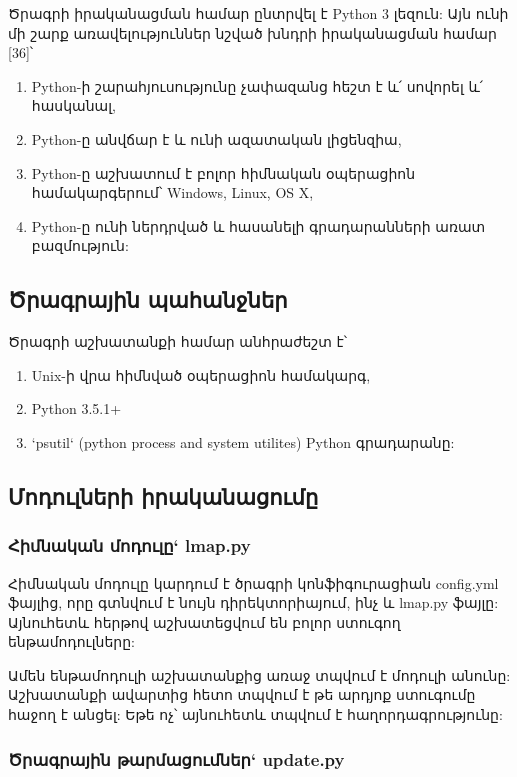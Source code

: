 \documentclass[a4paper,12pt]{article}
\begin{document}
\begin{sloppypar}
Ծրագրի իրականացման համար ընտրվել է Python 3 լեզուն:
Այն ունի մի շարք առավելություններ նշված խնդրի իրականացման համար [36]՝

\begin{enumerate}
\item Python-ի շարահյուսությունը չափազանց հեշտ է և՛ սովորել և՛ հասկանալ,
\item Python-ը անվճար է և ունի ազատական լիցենզիա,
\item Python-ը աշխատում է բոլոր հիմնական օպերացիոն համակարգերում՝ Windows, Linux, OS X,
\item Python-ը ունի ներդրված և հասանելի գրադարանների առատ բազմություն:
\end{enumerate}


\subsection{Ծրագրային պահանջներ}

Ծրագրի աշխատանքի համար անհրաժեշտ է՝

\begin{enumerate}
\item Unix-ի վրա հիմնված օպերացիոն համակարգ,
\item Python 3.5.1+
\item `psutil` (python process and system utilites) Python գրադարանը:
\end{enumerate}

\subsection{Մոդուլների իրականացումը}


\subsubsection{Հիմնական մոդուլը` lmap.py}


Հիմնական մոդուլը կարդում է ծրագրի կոնֆիգուրացիան config.yml ֆայլից,
որը գտնվում է նույն դիրեկտորիայում, ինչ և lmap.py ֆայլը: Այնուհետև
հերթով աշխատեցվում են բոլոր ստուգող ենթամոդուլները:

Ամեն ենթամոդուլի աշխատանքից առաջ տպվում է մոդուլի անունը:
Աշխատանքի ավարտից հետո տպվում է թե արդյոք ստուգումը հաջող է անցել:
Եթե ոչ՝ այնուհետև տպվում է հաղորդագրությունը:


\subsubsection{Ծրագրային թարմացումներ` update.py}



\end{sloppypar}
\end{document}
